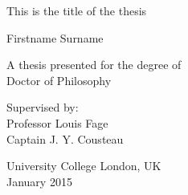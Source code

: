 \documentclass[11pt,letterpaper,]{article}
\date{}
\begin{document}




\begin{titlepage}
    \begin{center}

        
        \vspace*{2.5cm}
        
        \huge
        This is the title of the thesis
        
        \vspace{1.5cm}
        
        \Large
        Firstname Surname

        \vspace{1.5cm}

        \normalsize
        A thesis presented for the degree of\\
        Doctor of Philosophy
        
        \vfill
        
        \normalsize
        Supervised by:\\
        Professor Louis Fage\\
        Captain J. Y. Cousteau

        \vspace{0.8cm}

        
        \normalsize
        University College London, UK\\
        January 2015


    \end{center}
\end{titlepage}
\end{document}
